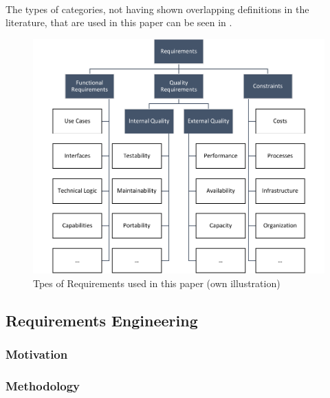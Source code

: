 \paragraph{} The types of categories, not having shown overlapping definitions in the literature, that are used in this paper can be seen in .

\begin{figure}[H]
    \centering
    \includegraphics[scale=1]{img/RequirementTypes.pdf}
    \caption[Requirement Types]{Tpes of Requirements used in this paper (own illustration)}
    \label{fig:reqTypes}
\end{figure}
\subsection{Requirements Engineering}
\subsubsection{Motivation}
 
 
\subsubsection{Methodology}

